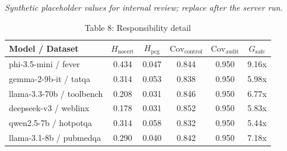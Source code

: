 

\begin{table}[h]
\centering
\small
  \textit{Synthetic placeholder values for internal review; replace after the server run.}
\caption{Table 8: Responsibility detail}
\label{tab:responsibility_detail}
\begin{tabular}{l|cc|cc|c}
\hline
Model / Dataset & $H_{\mathrm{nocert}}$ & $H_{\mathrm{pcg}}$ & $\mathrm{Cov}_{\mathrm{control}}$ & $\mathrm{Cov}_{\mathrm{audit}}$ & $G_{\mathrm{safe}}$ \\
\hline
phi-3.5-mini / fever & 0.434 & 0.047 & 0.844 & 0.950 & 9.16x \\
gemma-2-9b-it / tatqa & 0.314 & 0.053 & 0.838 & 0.950 & 5.98x \\
llama-3.3-70b / toolbench & 0.208 & 0.031 & 0.846 & 0.950 & 6.77x \\
deepseek-v3 / weblinx & 0.178 & 0.031 & 0.852 & 0.950 & 5.83x \\
qwen2.5-7b / hotpotqa & 0.314 & 0.058 & 0.832 & 0.950 & 5.44x \\
llama-3.1-8b / pubmedqa & 0.290 & 0.040 & 0.842 & 0.950 & 7.18x \\
\hline
\end{tabular}
\end{table}
